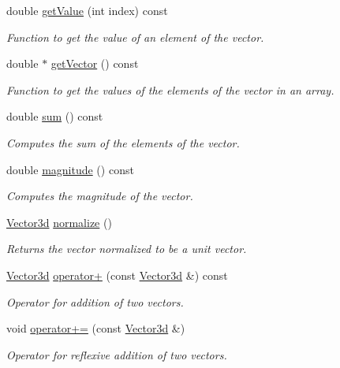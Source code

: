 \begin{DoxyCompactItemize}
double \hyperlink{classVector3d_a114fda84a6723e54678d9dde244725a4}{get\-Value} (int index) const 
\begin{DoxyCompactList}\small\item\em Function to get the value of an element of the vector. \end{DoxyCompactList}\item 
double $\ast$ \hyperlink{classVector3d_aae41ae56c3c37a6a7ecb4762abf8cbf4}{get\-Vector} () const 
\begin{DoxyCompactList}\small\item\em Function to get the values of the elements of the vector in an array. \end{DoxyCompactList}\item 
double \hyperlink{classVector3d_ae27b1ede7f5be29d80d95099f2ef3e23}{sum} () const 
\begin{DoxyCompactList}\small\item\em Computes the sum of the elements of the vector. \end{DoxyCompactList}\item 
double \hyperlink{classVector3d_adeda019b2d7ee805dece85650bdf6ed6}{magnitude} () const 
\begin{DoxyCompactList}\small\item\em Computes the magnitude of the vector. \end{DoxyCompactList}\item 
\hyperlink{classVector3d}{Vector3d} \hyperlink{classVector3d_a24acba00068d9d1612404243f2a01078}{normalize} ()
\begin{DoxyCompactList}\small\item\em Returns the vector normalized to be a unit vector. \end{DoxyCompactList}\item 
\hyperlink{classVector3d}{Vector3d} \hyperlink{classVector3d_ad714ad56910f370335c18262dc5cc13a}{operator+} (const \hyperlink{classVector3d}{Vector3d} \&) const 
\begin{DoxyCompactList}\small\item\em Operator for addition of two vectors. \end{DoxyCompactList}\item 
void \hyperlink{classVector3d_a034e9f847d613c9cba1cb47202b8143a}{operator+=} (const \hyperlink{classVector3d}{Vector3d} \&)
\begin{DoxyCompactList}\small\item\em Operator for reflexive addition of two vectors. \end{DoxyCompactList}\item 

\end{DoxyCompactItemize}
